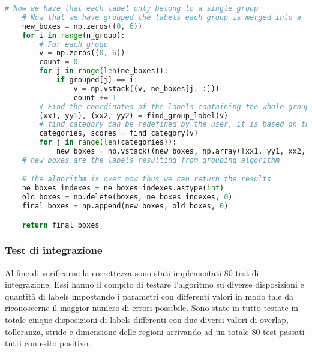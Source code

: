 \begin{lstlisting}[language=Python, caption=Python example]
    # Now we have that each label only belong to a single group
    # Now that we have grouped the labels each group is merged into a label containing all of them
    new_boxes = np.zeros((0, 6))
    for i in range(n_group):
        # For each group
        v = np.zeros((0, 6))
        count = 0
        for j in range(len(ne_boxes)):
            if grouped[j] == i:
                v = np.vstack((v, ne_boxes[j, :]))
                count += 1
        # Find the coordinates of the labels containing the whole group
        (xx1, yy1), (xx2, yy2) = find_group_label(v)
        # find_category can be redefined by the user, it is based on the category and score of the labels of the group
        categories, scores = find_category(v)
        for j in range(len(categories)):
            new_boxes = np.vstack((new_boxes, np.array([xx1, yy1, xx2, yy2, categories[j], scores[j]])))
    # new_boxes are the labels resulting from grouping algorithm

    # The algorithm is over now thus we can return the results
    ne_boxes_indexes = ne_boxes_indexes.astype(int)
    old_boxes = np.delete(boxes, ne_boxes_indexes, 0)
    final_boxes = np.append(new_boxes, old_boxes, 0)

    return final_boxes
\end{lstlisting}
\subsubsection{Test di integrazione}
Al fine di verificarne la correttezza sono stati implementati 80 test di integrazione. Essi hanno il compito di testare l'algoritmo su diverse disposizioni e quantità di labels impostando i parametri con differenti valori in modo tale da riconoscerne il maggior numero di errori possibile. Sono state in tutto testate in totale cinque disposizioni di labels differenti con due diversi valori di overlap, tolleranza, stride e dimensione delle regioni arrivando ad un totale 80 test passati tutti con esito positivo.

